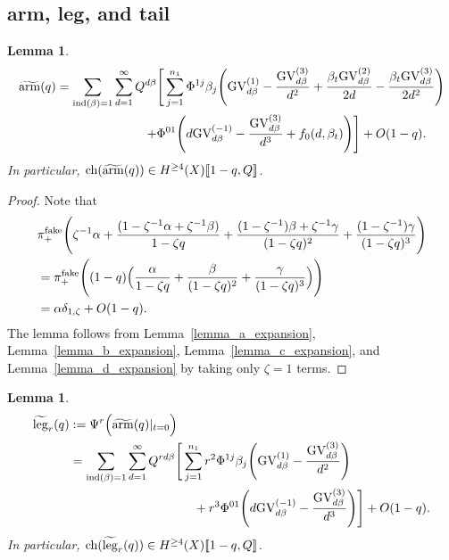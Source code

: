 \documentclass[11pt]{amsart}
\newtheorem{lemma}[theorem]{Lemma}
\newtheorem*{main theorem*}{Main Theorem}
\theoremstyle{remark}
\numberwithin{equation}{section}
\newcommand{\ch}{{\rm ch}}
\newcommand{\fake}{{\rm fake}}
\newcommand{\leg}{{\rm leg}}
\newcommand{\arm}{{\rm arm}}
\newcommand{\GV}{{\mathrm{GV}}}
\begin{document}
\subsection{arm, leg, and tail} \label{s:3.4}
\begin{lemma} \label{lemma_arm_expansion}
\[
\begin{split}
    \widetilde{\arm} (q) = \sum_{{\rm ind}(\beta)=1} \sum_{d=1}^{\infty} Q^{d\beta} &\Bigg[ \sum_{j=1}^{n_1} \Phi^{1j} \beta_j  \Bigg( \GV_{d\beta}^{(1)} - \frac{\GV_{d\beta}^{(3)}}{d^2}  + \frac{\beta_t\GV_{d\beta}^{(2)}}{2d} - \frac{\beta_t\GV_{d\beta}^{(3)}} {2d^2} \Bigg)
    \\
    + &\Phi^{01} \Bigg( d\GV_{d\beta}^{(-1)} - \frac{\GV_{d\beta}^{(3)}}{d^3} + f_0(d,\beta_t) \Bigg) \Bigg] + O(1-q) .
\end{split}
\] 
In particular, $\ch(\widetilde{\arm} (q)) \in H^{\geq 4}(X)[\![1-q,Q]\!]$.
\end{lemma}
\begin{proof}
Note that 
\[
\begin{split}
    & \pi_+^{\fake} \Bigg( \zeta^{-1}\alpha + \frac{ (1-\zeta^{-1}\alpha + \zeta^{-1}\beta ) }{1-\zeta q} + \frac{ (1-\zeta^{-1})\beta + \zeta^{-1} \gamma }{(1-\zeta q)^2} + \frac{ (1-\zeta^{-1}) \gamma }{(1-\zeta q)^3} \Bigg)
    \\
    & = \pi_+^{\fake} \Bigg( (1-q) \Big(  \frac{\alpha}{1-\zeta q} + \frac{\beta}{(1-\zeta q)^2} + \frac{\gamma}{(1-\zeta q)^3}   \Big) \Bigg)
    \\
    & = \alpha \delta_{1,\zeta} + O(1-q).
\end{split}
\]
The lemma follows from Lemma~\ref{lemma_a_expansion}, Lemma~\ref{lemma_b_expansion}, Lemma~\ref{lemma_c_expansion}, and Lemma~\ref{lemma_d_expansion} by taking only $\zeta=1$ terms.
\end{proof}
\begin{lemma} \label{lemma_leg_expansion}
\[
\begin{split}
    \widetilde{\leg}_r (q) &:= \Psi^r \Big( \widetilde{\arm} (q)|_{t=0} \Big)
    \\
    & = \sum_{{\rm ind}(\beta)=1} \sum_{d=1}^{\infty} Q^{rd\beta} \Bigg[ \sum_{j=1}^{n_1}  r^2\Phi^{1j} \beta_j \Bigg( \GV_{d\beta}^{(1)} - \frac{\GV_{d\beta}^{(3)}}{d^2} \Bigg)
    \\
    &\hspace{35mm} + r^3 \Phi^{01} \Bigg( d\GV_{d\beta}^{(-1)} - \frac{\GV_{d\beta}^{(3)}}{d^3}  \Bigg) \Bigg] + O(1-q).
\end{split}
\]
In particular, $\ch(\widetilde{\leg}_r (q)) \in H^{\geq 4}(X)[\![1-q,Q]\!]$.
\end{lemma}
\end{document}
